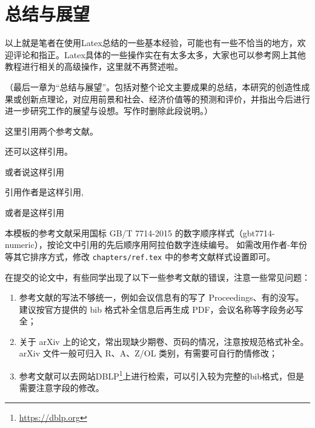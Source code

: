 \chapter{总结与展望}


以上就是笔者在使用Latex总结的一些基本经验，可能也有一些不恰当的地方，欢迎评论和指正。Latex具体的一些操作实在有太多太多，大家也可以参考网上其他教程进行相关的高级操作，这里就不再赘述啦。

（最后一章为“总结与展望”。包括对整个论文主要成果的总结，本研究的创造性成果或创新点理论，对应用前景和社会、经济价值等的预测和评价，并指出今后进行进一步研究工作的展望与设想。写作时删除此段说明。）

这里引用两个参考文献\cite{2001Applying}\cite{2004PSO_ZhangLibiao}。

还可以这样引用\cite{2001Applying,2021A}。

或者说这样引用\cite{2001Applying,2004PSO_ZhangLibiao,2021A}

引用作者是这样引用\citet{2001Applying},\citet{2004PSO_ZhangLibiao}

或者是这样引用\citep{2001Applying}

本模板的参考文献采用国标 GB/T 7714-2015 的数字顺序样式（gbt7714-numeric），按论文中引用的先后顺序用阿拉伯数字连续编号。
如需改用作者-年份等其它排序方式，修改 \texttt{chapters/ref.tex} 中的参考文献样式设置即可。

在提交的论文中，有些同学出现了以下一些参考文献的错误，注意一些常见问题：
\begin{enumerate}
    \item 参考文献的写法不够统一，例如会议信息有的写了 Proceedings、有的没写。建议按官方提供的 bib 格式补全信息后再生成 PDF，会议名称等字段务必写全；
    \item 关于 arXiv 上的论文，常出现缺少期卷、页码的情况，注意按规范格式补全。arXiv 文件一般可归入 R、A、Z/OL 类别，有需要可自行酌情修改；
    \item 参考文献可以去网站DBLP\footnote{\url{https://dblp.org}}上进行检索，可以引入较为完整的bib格式，但是需要注意字段的修改。
\end{enumerate}
